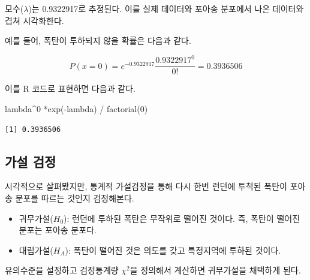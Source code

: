 \documentclass[
  letterpaper,
  chapter,a4paper,showtrims,openright,hidelinks]{oblivoir}
\newenvironment{Shaded}{\begin{snugshade}}{\end{snugshade}}
\newcommand{\AttributeTok}[1]{\textcolor[rgb]{0.40,0.45,0.13}{#1}}
\newcommand{\CommentTok}[1]{\textcolor[rgb]{0.37,0.37,0.37}{#1}}
\newcommand{\ConstantTok}[1]{\textcolor[rgb]{0.56,0.35,0.01}{#1}}
\newcommand{\DecValTok}[1]{\textcolor[rgb]{0.68,0.00,0.00}{#1}}
\newcommand{\FunctionTok}[1]{\textcolor[rgb]{0.28,0.35,0.67}{#1}}
\newcommand{\NormalTok}[1]{\textcolor[rgb]{0.00,0.23,0.31}{#1}}
\newcommand{\SpecialCharTok}[1]{\textcolor[rgb]{0.37,0.37,0.37}{#1}}
\providecommand{\tightlist}{%
  \setlength{\itemsep}{0pt}\setlength{\parskip}{0pt}}\usepackage{longtable,booktabs,array}
\begin{document}
모수(\(\lambda\))는 0.9322917로 추정된다. 이를 실제 데이터와 포아송
분포에서 나온 데이터와 겹쳐 시각화한다.

예를 들어, 폭탄이 투하되지 않을 확률은 다음과 같다.

\[P(x=0) = e^{-0.9322917}\frac{0.9322917^0}{0!} = 0.3936506\]

이를 R 코드로 표현하면 다음과 같다.

\begin{Shaded}
\begin{Highlighting}[]
\NormalTok{lambda}\SpecialCharTok{\^{}}\DecValTok{0} \SpecialCharTok{*}\FunctionTok{exp}\NormalTok{(}\SpecialCharTok{{-}}\NormalTok{lambda) }\SpecialCharTok{/} \FunctionTok{factorial}\NormalTok{(}\DecValTok{0}\NormalTok{)}
\end{Highlighting}
\end{Shaded}

\begin{verbatim}
[1] 0.3936506
\end{verbatim}

\hypertarget{v2-goodness-of-fit}{%
\subsection{가설 검정}\label{v2-goodness-of-fit}}

시각적으로 살펴봤지만, 통계적 가설검정을 통해 다시 한번 런던에 투척된
폭탄이 포아송 분포를 따르는 것인지 검정해본다.

\begin{itemize}
\tightlist
\item
  귀무가설(\(H_0\)): 런던에 투하된 폭탄은 무작위로 떨어진 것이다. 즉,
  폭탄이 떨어진 분포는 포아송 분포다.
\item
  대립가설(\(H_A\)): 폭탄이 떨어진 것은 의도를 갖고 특정지역에 투하된
  것이다.
\end{itemize}

유의수준을 설정하고 검정통계량 \(\chi^2\)을 정의해서 계산하면 귀무가설을
채택하게 된다.

\begin{Shaded}
\end{Shaded}
\end{document}
